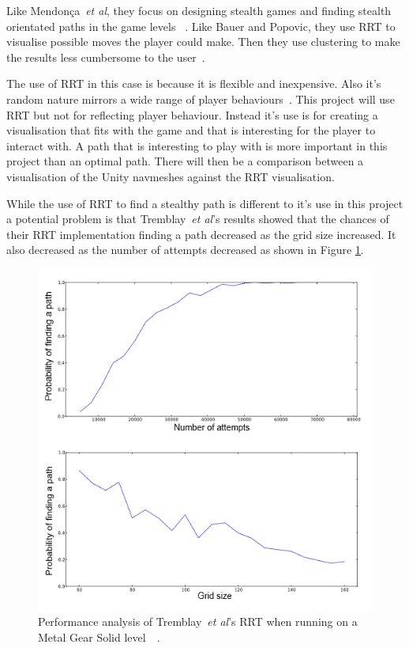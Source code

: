 \documentclass[journal]{IEEEtran}
\begin{document}
Like Mendonça~\textit{et al}, they focus on designing stealth games and finding stealth orientated paths in the game levels~\cite{Mendonça2015} \cite{Tremblay2013} . Like Bauer and Popovic, they use RRT to visualise possible moves the player could make. Then they use clustering to make the results less cumbersome to the user~\cite{Tremblay2013}. 

The use of RRT in this case is because it is flexible and inexpensive. Also it's random nature mirrors a wide range of player behaviours~\cite{Tremblay2013}. 
This project will use RRT but not for reflecting player behaviour.  Instead it's use  is for creating a visualisation that fits with the game and that is interesting for the player to interact with. A path that is interesting to play with is more important in this project than an optimal path. There will then be a comparison between a visualisation of the Unity navmeshes against the RRT visualisation.

While the use of RRT to find a stealthy path is different to it's use in this project a potential problem is that Tremblay~\textit{et al}'s results showed that the chances of their RRT implementation finding a path decreased as the grid size increased. It also decreased as the number of attempts decreased as shown in Figure \ref{TremblayRRT}. 


\begin{figure}[h]
	\includegraphics[width=1.0\linewidth]{Tremblay2013.png}
	\caption{ Performance analysis of Tremblay~\textit{et al}'s RRT when running on a Metal Gear Solid level~\cite{Tremblay2013}~\cite{game:MetalGearSolid}.}
	\label{TremblayRRT}
\end{figure} 
\end{document}

